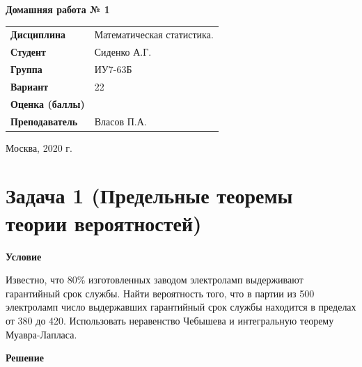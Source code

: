\documentclass[a4paper,14pt]{extreport} %
\begin{document}
\begin{titlepage}
    \vspace{2cm}

    \begin{center}
        \textbf{Домашняя работа № 1} \\
        \vspace{0.5cm}
    \end{center}

    \vspace{5cm}

    \begin{flushleft}
        \begin{tabular}{ll}
            \textbf{Дисциплина} & Математическая статистика.  \\
            \textbf{Студент} & Сиденко А.Г. \\
            \textbf{Группа} & ИУ7-63Б \\
            \textbf{Вариант} & 22 \\
            \textbf{Оценка (баллы)} & \\
            \textbf{Преподаватель} & Власов П.А.   \\
        \end{tabular}
    \end{flushleft}

    \vspace{4cm}

   \begin{center}
        Москва, 2020 г.
    \end{center}

\end{titlepage}

\section{Задача 1 (Предельные теоремы теории вероятностей)}

\hfill

\textbf{Условие}

Известно, что 80\% изготовленных заводом электроламп выдерживают гарантийный срок службы. Найти вероятность того, что в партии из 500 электроламп число выдержавших гарантийный срок службы находится в пределах от 380 до 420. Использовать неравенство Чебышева и интегральную теорему Муавра-Лапласа.

\hfill

\textbf{Решение}
\end{document}
